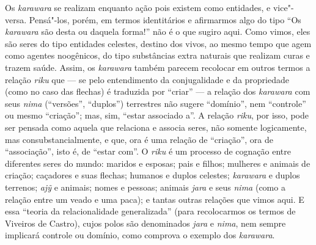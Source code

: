 Os \emph{karawara} se realizam enquanto ação pois existem como
entidades, e vice"-versa. Pensá"-los, porém, em termos identitários e
afirmarmos algo do tipo ``Os \emph{karawara} são desta ou daquela forma!''
não é o que sugiro aqui. Como vimos, eles são seres do tipo entidades
celestes, destino dos vivos, ao mesmo tempo que agem como agentes
noogênicos, do tipo substâncias extra naturais que realizam curas e
trazem saúde. Assim, os \emph{karawara} também parecem recolocar em
outros termos a relação \emph{riku} que --- se pelo entendimento da
conjugalidade e da propriedade (como no caso das flechas) é traduzida
por ``criar'' --- a relação dos \emph{karawara} com seus \emph{nima}
(``versões'', ``duplos'') terrestres não sugere ``domínio'', nem ``controle'' ou
mesmo ``criação''; mas, sim, ``estar associado a''. A relação \emph{riku},
por isso, pode ser pensada como aquela que relaciona e associa seres,
não somente logicamente, mas consubstancialmente, e que, ora é uma
relação de ``criação'', ora de ``associação'', isto é, de ``estar com''. O
\emph{riku} é um processo de cognação entre diferentes seres do mundo:
maridos e esposas; pais e filhos; mulheres e animais de criação;
caçadores e suas flechas; humanos e duplos celestes; \emph{karawara} e
duplos terrenos; \emph{ajỹ} e animais; nomes e pessoas; animais
\emph{jara} e seus \emph{nima} (como a relação entre um veado e uma
paca); e tantas outras relações que vimos aqui. E essa ``teoria da
relacionalidade generalizada'' (para recolocarmos os termos de Viveiros
de Castro), cujos polos são denominados \emph{jara} e \emph{nima}, nem
sempre implicará controle ou domínio, como comprova o exemplo dos
\emph{karawara}.

